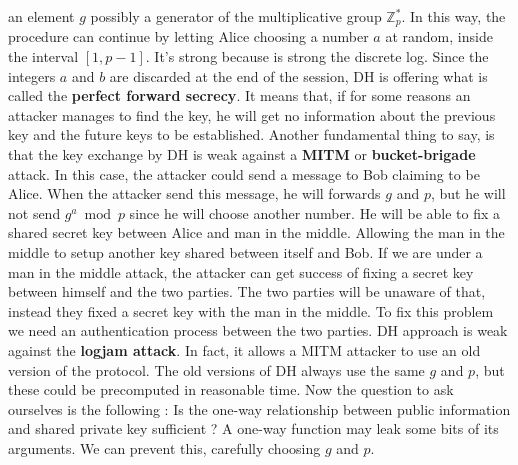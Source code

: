 \documentclass[11pt]{article}
\begin{document}
an element $g$ possibly a generator of the multiplicative group $\mathbb{Z}_p^{*}$. In this way, the procedure can continue by letting Alice choosing a number $a$ at random, inside the interval $[1, p - 1]$. It's strong because is strong the discrete log. Since the integers $a$ and $b$ are discarded at the end of the session, DH is offering what is called the \textbf{perfect forward secrecy}. It means that, if for some reasons an attacker manages to find the key, he will get no information about the previous key and the future keys to be established. Another fundamental thing to say, is that the key exchange by DH is weak against a \textbf{MITM} or \textbf{bucket-brigade} attack. In this case, the attacker could send a message to Bob claiming to be Alice. When the attacker send this message, he will forwards $g$ and $p$, but he will not send $g^a \bmod p$ since he will choose another number. He will be able to fix a shared secret key between Alice and man in the middle. Allowing the man in the middle to setup another key shared between itself and Bob. If we are under a man in the middle attack, the attacker can get success of fixing a secret key between himself and the two parties. The two parties will be unaware of that, instead they fixed a secret key with the man in the middle. To fix this problem we need an authentication process between the two parties. DH approach is weak against the \textbf{logjam attack}. In fact, it allows a MITM attacker to use an old version of the protocol. The old versions of DH always use the same $g$ and $p$, but these could be precomputed in reasonable time. Now the question to ask ourselves is the following : Is the one-way relationship between public information and shared private key sufficient ? A one-way function may leak some bits of its arguments. We can prevent this, carefully choosing $g$ and $p$.
\end{document}
